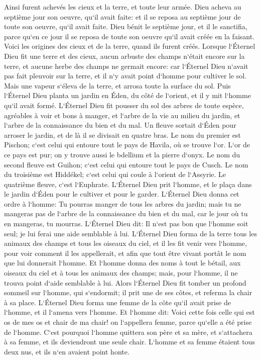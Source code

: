\verse Ainsi furent achevés les cieux et la terre, et toute leur armée. 
\verse Dieu acheva au septième jour son oeuvre, qu`il avait faite: et il se reposa au septième jour de toute son oeuvre, qu`il avait faite. 
\verse Dieu bénit le septième jour, et il le sanctifia, parce qu`en ce jour il se reposa de toute son oeuvre qu`il avait créée en la faisant. 
\verse Voici les origines des cieux et de la terre, quand ils furent créés. 
\verse Lorsque l`Éternel Dieu fit une terre et des cieux, aucun arbuste des champs n`était encore sur la terre, et aucune herbe des champs ne germait encore: car l`Éternel Dieu n`avait pas fait pleuvoir sur la terre, et il n`y avait point d`homme pour cultiver le sol. 
\verse Mais une vapeur s`éleva de la terre, et arrosa toute la surface du sol. 
\verse Puis l`Éternel Dieu planta un jardin en Éden, du côté de l`orient, et il y mit l`homme qu`il avait formé. 
\verse L`Éternel Dieu fit pousser du sol des arbres de toute espèce, agréables à voir et bons à manger, et l`arbre de la vie au milieu du jardin, et l`arbre de la connaissance du bien et du mal. 
\verse Un fleuve sortait d`Éden pour arroser le jardin, et de là il se divisait en quatre bras. 
\verse Le nom du premier est Pischon; c`est celui qui entoure tout le pays de Havila, où se trouve l`or. 
\verse L`or de ce pays est pur; on y trouve aussi le bdellium et la pierre d`onyx. 
\verse Le nom du second fleuve est Guihon; c`est celui qui entoure tout le pays de Cusch. 
\verse Le nom du troisième est Hiddékel; c`est celui qui coule à l`orient de l`Assyrie. Le quatrième fleuve, c`est l`Euphrate. 
\verse L`Éternel Dieu prit l`homme, et le plaça dans le jardin d`Éden pour le cultiver et pour le garder. 
\verse L`Éternel Dieu donna cet ordre à l`homme: Tu pourras manger de tous les arbres du jardin; 
\verse mais tu ne mangeras pas de l`arbre de la connaissance du bien et du mal, car le jour où tu en mangeras, tu mourras. 
\verse L`Éternel Dieu dit: Il n`est pas bon que l`homme soit seul; je lui ferai une aide semblable à lui. 
\verse L`Éternel Dieu forma de la terre tous les animaux des champs et tous les oiseaux du ciel, et il les fit venir vers l`homme, pour voir comment il les appellerait, et afin que tout être vivant portât le nom que lui donnerait l`homme. 
\verse Et l`homme donna des noms à tout le bétail, aux oiseaux du ciel et à tous les animaux des champs; mais, pour l`homme, il ne trouva point d`aide semblable à lui. 
\verse Alors l`Éternel Dieu fit tomber un profond sommeil sur l`homme, qui s`endormit; il prit une de ses côtes, et referma la chair à sa place. 
\verse L`Éternel Dieu forma une femme de la côte qu`il avait prise de l`homme, et il l`amena vers l`homme. 
\verse Et l`homme dit: Voici cette fois celle qui est os de mes os et chair de ma chair! on l`appellera femme, parce qu`elle a été prise de l`homme. 
\verse C`est pourquoi l`homme quittera son père et sa mère, et s`attachera à sa femme, et ils deviendront une seule chair. 
\verse L`homme et sa femme étaient tous deux nus, et ils n`en avaient point honte. 

